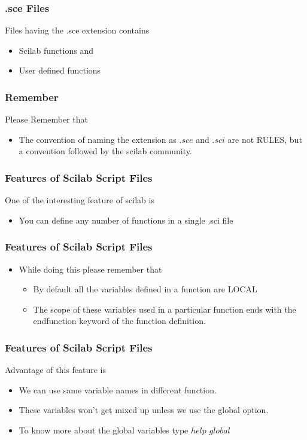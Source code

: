 \documentclass[17pt]{beamer}
\begin{document}
\begin{frame}[fragile]
\frametitle{.sce Files}
Files having the .sce extension contains\pause
\begin{itemize}
\item Scilab functions and
\item User defined functions
\end{itemize}
\end{frame}

\begin{frame}
\frametitle{Remember}
Please Remember that\pause
\vspace{0.5cm}
\begin{itemize}
\item The convention of naming the extension as $.sce$ and $.sci$ are not RULES, but a convention followed by the scilab community.
\end{itemize}
\end{frame}

\begin{frame}
\frametitle{Features of Scilab Script Files}
One of the interesting feature of scilab is\pause
\begin{itemize}
\item<+-|alert@+> You can define any number of functions in a single .sci file
\end{itemize}
\end{frame}

\begin{frame}
\frametitle{Features of Scilab Script Files}
\begin{itemize}
\item<+-|alert@+> While doing this please remember that
\begin{itemize}
\item<+-|alert@+> By default all the variables defined in a function are LOCAL
\item<+-|alert@+> The scope of these variables used in a particular function ends with the endfunction keyword of the function definition.
\end{itemize}
\end{itemize}
\end{frame}


\begin{frame}
\frametitle{Features of Scilab Script Files}
Advantage of this feature is\pause
\begin{itemize}
\item<+-|alert@+> We can use same variable names in different function.
\item<+-|alert@+> These variables won't get mixed up unless we use the global option.
\item<+-|alert@+> To know more about the global variables type $help$  $global$
\end{itemize}
\end{frame}
\end{document}
